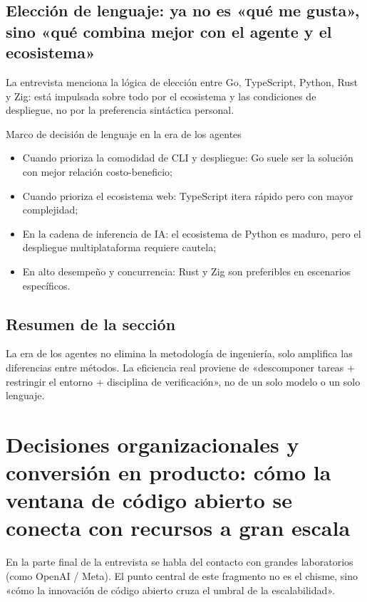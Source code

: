 \documentclass[a4paper]{article}
\begin{document}
\subsection{Elección de lenguaje: ya no es «qué me gusta», sino «qué combina mejor con el agente y el ecosistema»}

La entrevista menciona la lógica de elección entre Go, TypeScript, Python, Rust y Zig: está impulsada sobre todo por el ecosistema y las condiciones de despliegue, no por la preferencia sintáctica personal.

\begin{importantbox}{Marco de decisión de lenguaje en la era de los agentes}
\begin{itemize}
    \item Cuando prioriza la comodidad de CLI y despliegue: Go suele ser la solución con mejor relación costo-beneficio;
    \item Cuando prioriza el ecosistema web: TypeScript itera rápido pero con mayor complejidad;
    \item En la cadena de inferencia de IA: el ecosistema de Python es maduro, pero el despliegue multiplataforma requiere cautela;
    \item En alto desempeño y concurrencia: Rust y Zig son preferibles en escenarios específicos.
\end{itemize}
\end{importantbox}

\subsection{Resumen de la sección}
La era de los agentes no elimina la metodología de ingeniería, solo amplifica las diferencias entre métodos. La eficiencia real proviene de «descomponer tareas + restringir el entorno + disciplina de verificación», no de un solo modelo o un solo lenguaje.

\section{Decisiones organizacionales y conversión en producto: cómo la ventana de código abierto se conecta con recursos a gran escala}

En la parte final de la entrevista se habla del contacto con grandes laboratorios (como OpenAI / Meta). El punto central de este fragmento no es el chisme, sino «cómo la innovación de código abierto cruza el umbral de la escalabilidad».
\end{document}
